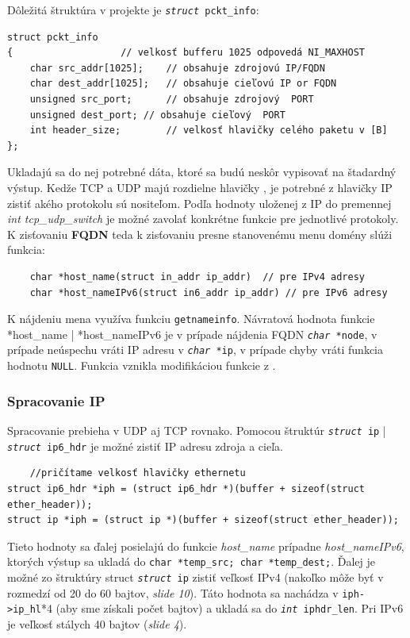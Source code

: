 \documentclass[11pt, a4paper]{article}
\begin{document}
	Dôležitá štruktúra v projekte je \texttt{\emph{struct} pckt\_info}:
	\begin{lstlisting}
struct pckt_info 
{					// velkosť bufferu 1025 odpovedá NI_MAXHOST 
    char src_addr[1025];	// obsahuje zdrojovú IP/FQDN  
    char dest_addr[1025];	// obsahuje cieľovú IP or FQDN
    unsigned src_port;		// obsahuje zdrojový  PORT
    unsigned dest_port;	// obsahuje cieľový  PORT
    int header_size;		// velkosť hlavičky celého paketu v [B] 
};
	\end{lstlisting}
	Ukladajú sa do nej potrebné dáta, ktoré sa budú neskôr vypisovať na štadardný výstup.
	Kedže TCP a UDP majú rozdielne hlavičky \cite{prednaskaTransport}, je potrebné z hlavičky IP zistiť akého protokolu sú nositeľom. Podľa hodnoty uloženej z IP do premennej \emph{int tcp\_udp\_switch} je možné zavolať konkrétne funkcie pre jednotlivé protokoly.
	K zisťovaniu \textbf{FQDN} teda k zisťovaniu presne stanovenému menu domény \cite{WikiFQDN} slúži funkcia:
	\begin{lstlisting}
	char *host_name(struct in_addr ip_addr)  // pre IPv4 adresy
	char *host_nameIPv6(struct in6_addr ip_addr) // pre IPv6 adresy
	\end{lstlisting}
	K nájdeniu mena využíva funkciu \texttt{getnameinfo}. Návratová hodnota funkcie *host\_name | *host\_nameIPv6 je v prípade nájdenia FQDN \texttt{\emph{char} *node}, v prípade neúspechu vráti IP adresu v \texttt{\emph{char} *ip}, v prípade chyby vráti funkcia hodnotu \texttt{NULL}. Funkcia vznikla modifikáciou funkcie z \cite{hostname}.
	
	\subsubsection{Spracovanie IP}
	\label{spracovanie IP}
	Spracovanie prebieha v UDP aj TCP rovnako.
	Pomocou štruktúr \texttt{\emph{struct} ip} | \texttt{\emph{struct} ip6\_hdr} je možné zistiť IP adresu zdroja a cieľa. 
	\begin{lstlisting}
	//pričítame velkosť hlavičky ethernetu
struct ip6_hdr *iph = (struct ip6_hdr *)(buffer + sizeof(struct ether_header));
struct ip *iph = (struct ip *)(buffer + sizeof(struct ether_header));	
	\end{lstlisting}
	
Tieto hodnoty sa ďalej posielajú do funkcie \emph{host\_name} prípadne \emph{host\_nameIPv6}, ktorých výstup sa ukladá do \texttt{char *temp\_src;
    char *temp\_dest;}. Ďalej je možné zo štruktúry struct \texttt{\emph{struct} ip} zistiť veľkosť IPv4 (nakoľko môže byť v rozmedzí od 20 do 60 bajtov, \emph{slide 10}\cite{prednaskaIPv4}). Táto hodnota sa nachádza v \texttt{iph->ip\_hl}*4 (aby sme získali počet bajtov) a ukladá sa do \texttt{\emph{int} iphdr\_len}. Pri IPv6 je veľkosť stálych 40 bajtov (\emph{slide 4}\cite{prednaskaIPv6}).
    
\end{document}
